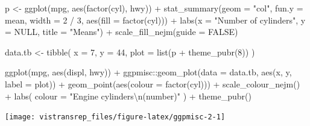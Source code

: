 \documentclass[]{book}
\newenvironment{Shaded}{}{}
\newcommand{\CharTok}[1]{\textcolor[rgb]{0.00,0.50,0.50}{#1}}
\newcommand{\DataTypeTok}[1]{#1}
\newcommand{\DecValTok}[1]{#1}
\newcommand{\KeywordTok}[1]{\textcolor[rgb]{0.00,0.00,1.00}{#1}}
\newcommand{\NormalTok}[1]{#1}
\newcommand{\OperatorTok}[1]{#1}
\newcommand{\OtherTok}[1]{\textcolor[rgb]{1.00,0.25,0.00}{#1}}
\newcommand{\StringTok}[1]{\textcolor[rgb]{0.00,0.50,0.50}{#1}}
\begin{document}
\begin{Shaded}
\begin{Highlighting}[]
\NormalTok{p <-}\StringTok{ }\KeywordTok{ggplot}\NormalTok{(mpg, }\KeywordTok{aes}\NormalTok{(}\KeywordTok{factor}\NormalTok{(cyl), hwy)) }\OperatorTok{+}
\StringTok{  }\KeywordTok{stat_summary}\NormalTok{(}\DataTypeTok{geom =} \StringTok{"col"}\NormalTok{, }\DataTypeTok{fun.y =}\NormalTok{ mean, }\DataTypeTok{width =} \DecValTok{2} \OperatorTok{/}\StringTok{ }\DecValTok{3}\NormalTok{, }\KeywordTok{aes}\NormalTok{(}\DataTypeTok{fill =} \KeywordTok{factor}\NormalTok{(cyl))) }\OperatorTok{+}
\StringTok{  }\KeywordTok{labs}\NormalTok{(}\DataTypeTok{x =} \StringTok{"Number of cylinders"}\NormalTok{, }\DataTypeTok{y =} \OtherTok{NULL}\NormalTok{, }\DataTypeTok{title =} \StringTok{"Means"}\NormalTok{) }\OperatorTok{+}
\StringTok{  }\KeywordTok{scale_fill_nejm}\NormalTok{(}\DataTypeTok{guide =} \OtherTok{FALSE}\NormalTok{)}

\NormalTok{data.tb <-}\StringTok{ }\KeywordTok{tibble}\NormalTok{(}
  \DataTypeTok{x =} \DecValTok{7}\NormalTok{, }\DataTypeTok{y =} \DecValTok{44}\NormalTok{,}
  \DataTypeTok{plot =} \KeywordTok{list}\NormalTok{(p }\OperatorTok{+}
\StringTok{    }\KeywordTok{theme_pubr}\NormalTok{(}\DecValTok{8}\NormalTok{))}
\NormalTok{)}
\end{Highlighting}
\end{Shaded}

\begin{Shaded}
\begin{Highlighting}[]
\KeywordTok{ggplot}\NormalTok{(mpg, }\KeywordTok{aes}\NormalTok{(displ, hwy)) }\OperatorTok{+}
\StringTok{  }\NormalTok{ggpmisc}\OperatorTok{::}\KeywordTok{geom_plot}\NormalTok{(}\DataTypeTok{data =}\NormalTok{ data.tb, }\KeywordTok{aes}\NormalTok{(x, y, }\DataTypeTok{label =}\NormalTok{ plot)) }\OperatorTok{+}
\StringTok{  }\KeywordTok{geom_point}\NormalTok{(}\KeywordTok{aes}\NormalTok{(}\DataTypeTok{colour =} \KeywordTok{factor}\NormalTok{(cyl))) }\OperatorTok{+}
\StringTok{  }\KeywordTok{scale_colour_nejm}\NormalTok{() }\OperatorTok{+}
\StringTok{  }\KeywordTok{labs}\NormalTok{(}
    \DataTypeTok{colour =} \StringTok{"Engine cylinders}\CharTok{\textbackslash{}n}\StringTok{(number)"}
\NormalTok{  ) }\OperatorTok{+}
\StringTok{  }\KeywordTok{theme_pubr}\NormalTok{()}
\end{Highlighting}
\end{Shaded}

\begin{flushright}\texttt{[image: vistransrep\_files/figure-latex/ggpmisc-2-1]} \end{flushright}
\end{document}
